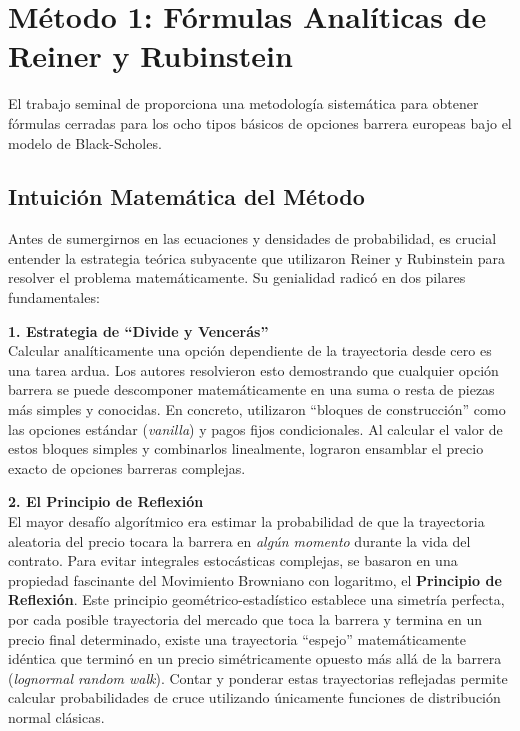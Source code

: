 \chapter{Método 1: Fórmulas Analíticas de Reiner y Rubinstein}
\label{chapter:metodo_rr}

El trabajo seminal de \cite{reiner1991breaking} proporciona una metodología sistemática para obtener fórmulas cerradas para los ocho tipos básicos de opciones barrera europeas bajo el modelo de Black-Scholes.

\section{Intuición Matemática del Método}

Antes de sumergirnos en las ecuaciones y densidades de probabilidad, es crucial entender la estrategia teórica subyacente que utilizaron Reiner y Rubinstein para resolver el problema matemáticamente. Su genialidad radicó en dos pilares fundamentales:

\textbf{1. Estrategia de ``Divide y Vencerás''}\\
Calcular analíticamente una opción dependiente de la trayectoria desde cero es una tarea ardua. Los autores resolvieron esto demostrando que cualquier opción barrera se puede descomponer matemáticamente en una suma o resta de piezas más simples y conocidas. En concreto, utilizaron ``bloques de construcción'' como las opciones estándar (\textit{vanilla}) y pagos fijos condicionales. Al calcular el valor de estos bloques simples y combinarlos linealmente, lograron ensamblar el precio exacto de opciones barreras complejas.

\textbf{2. El Principio de Reflexión}\\
El mayor desafío algorítmico era estimar la probabilidad de que la trayectoria aleatoria del precio tocara la barrera en \textit{algún momento} durante la vida del contrato. Para evitar integrales estocásticas complejas, se basaron en una propiedad fascinante del Movimiento Browniano con logaritmo, el \textbf{Principio de Reflexión}. Este principio geométrico-estadístico establece una simetría perfecta, por cada posible trayectoria del mercado que toca la barrera y termina en un precio final determinado, existe una trayectoria ``espejo'' matemáticamente idéntica que terminó en un precio simétricamente opuesto más allá de la barrera (\textit{lognormal random walk}). Contar y ponderar estas trayectorias reflejadas permite calcular probabilidades de cruce utilizando únicamente funciones de distribución normal clásicas.

